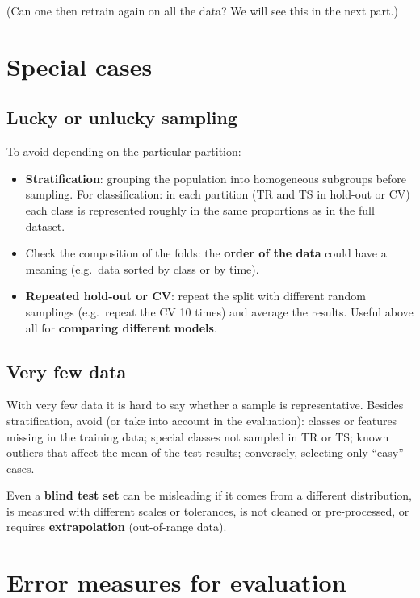 (Can one then retrain again on all the data? We will see this in the
next part.)

\section{Special cases}\label{casi-particolari}

\subsection{Lucky or unlucky
sampling}\label{campionamento-fortunato-o-sfortunato}

To avoid depending on the particular partition:

\begin{itemize}
\tightlist
\item
  \textbf{Stratification}: grouping the population into homogeneous
  subgroups before sampling. For classification: in each partition (TR
  and TS in hold-out or CV) each class is represented roughly in the
  same proportions as in the full dataset.
\item
  Check the composition of the folds: the \textbf{order of the data}
  could have a meaning (e.g.\ data sorted by class or by time).
\item
  \textbf{Repeated hold-out or CV}: repeat the split with different
  random samplings (e.g.\ repeat the CV 10 times) and average the
  results. Useful above all for \textbf{comparing different models}.
\end{itemize}

\subsection{Very few data}\label{pochissimi-dati}

With very few data it is hard to say whether a sample is
representative. Besides stratification, avoid (or take into account in
the evaluation): classes or features missing in the training data;
special classes not sampled in TR or TS; known outliers that affect the
mean of the test results; conversely, selecting only ``easy'' cases.

Even a \textbf{blind test set} can be misleading if it comes from a
different distribution, is measured with different scales or
tolerances, is not cleaned or pre-processed, or requires
\textbf{extrapolation} (out-of-range data).

\section{Error measures for
evaluation}\label{misure-derrore-per-la-valutazione}

